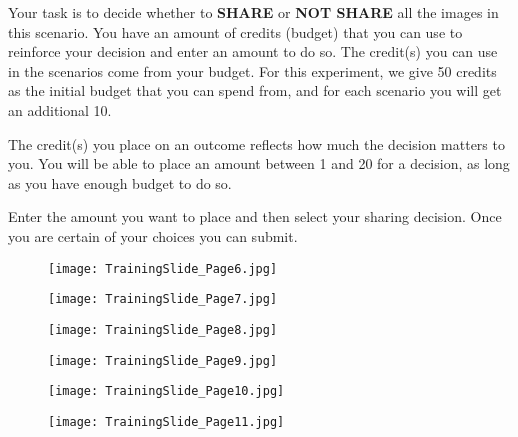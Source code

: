 Your task is to decide whether to \textbf{SHARE} or \textbf{NOT SHARE} all the images in this scenario. You have an amount of credits (budget) that you can use to reinforce your decision and enter an amount to do so.  The credit(s) you can use in the scenarios come from your budget. For this experiment, we give 50 credits as the initial budget that you can spend from, and for each scenario you will get an additional 10.

The credit(s) you place on an outcome reflects how much the decision matters to you. You will be able to place an amount between 1 and 20 for a decision, as long as you have enough budget to do so.

Enter the amount you want to place and then select your sharing decision. Once you are certain of your choices you can submit.

\begin{figure}[H]    \texttt{[image: TrainingSlide\_Page6.jpg]}
    \label{fig:ts_page6}
\end{figure}

\clearpage

\begin{figure}[H]    \texttt{[image: TrainingSlide\_Page7.jpg]}
    \label{fig:ts_page7}
\end{figure}

\begin{figure}[H]    \texttt{[image: TrainingSlide\_Page8.jpg]}
    \label{fig:ts_page8}
\end{figure}


\begin{figure}[H]    \texttt{[image: TrainingSlide\_Page9.jpg]}
    \label{fig:ts_page9}
\end{figure}

\begin{figure}[H]    \texttt{[image: TrainingSlide\_Page10.jpg]}
    \label{fig:ts_page10}
\end{figure}


\begin{figure}[H]    \texttt{[image: TrainingSlide\_Page11.jpg]}
    \label{fig:ts_page11}
\end{figure}

\vspace{-10mm}

